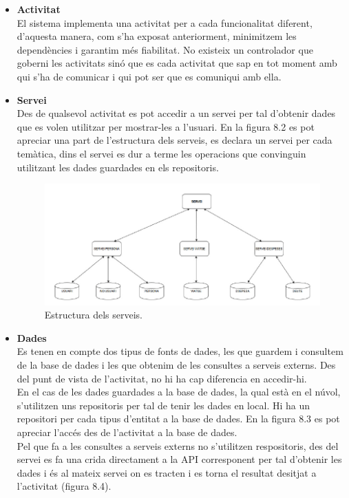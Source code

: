 \begin{itemize}

\item[]{\textbf{Activitat}}\\
El sistema implementa una activitat per a cada funcionalitat diferent, d'aquesta manera, com s'ha exposat anteriorment, minimitzem les dependències i garantim més fiabilitat. No existeix un controlador que goberni les activitats sinó que es cada activitat que sap en tot moment amb qui s'ha de comunicar i qui pot ser que es comuniqui amb ella.\\

\item[]{\textbf{Servei}}\\
Des de qualsevol activitat es pot accedir a un servei per tal d'obtenir dades que es volen utilitzar per mostrar-les a l'usuari. En la figura 8.2 es pot apreciar una part de l'estructura dels serveis, es declara un servei per cada temàtica, dins el servei es dur a terme les operacions que convinguin utilitzant les dades guardades en els repositoris.

\begin{figure}[!h]
\centering
\includegraphics[scale=0.70]{Figures/EstructuraServeis.jpg}
\caption{Estructura dels serveis.}
\end{figure}

\item[]{\textbf{Dades}}\\
Es tenen en compte dos tipus de fonts de dades, les que guardem i consultem de la base de dades i les que obtenim de les consultes a serveis externs. Des del punt de vista de l'activitat, no hi ha cap diferencia en accedir-hi. \\
En el cas de les dades guardades a la base de dades, la qual està en el núvol, s'utilitzen uns repositoris per tal de tenir les dades en local. Hi ha un repositori per cada tipus d'entitat a la base de dades. En la figura 8.3 es pot apreciar l'accés des de l'activitat a la base de dades.\\
Pel que fa a les consultes a serveis externs no s'utilitzen respositoris, des del servei es fa una crida directament a la API corresponent per tal d'obtenir les dades i és al mateix servei on es tracten i es torna el resultat desitjat a l'activitat (figura 8.4).



\end{itemize}
